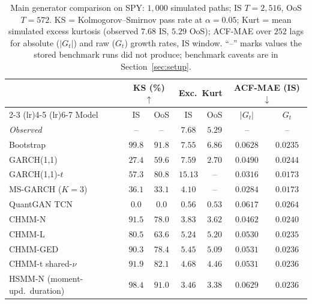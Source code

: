 \begin{table}[t]
\centering
\caption{Main generator comparison on SPY: $1{,}000$ simulated paths; IS $T = 2{,}516$, OoS $T = 572$. KS = Kolmogorov--Smirnov pass rate at $\alpha = 0.05$; Kurt = mean simulated excess kurtosis (observed $7.68$ IS, $5.29$ OoS); ACF-MAE over $252$ lags for absolute ($|G_t|$) and raw ($G_t$) growth rates, IS window. ``--'' marks values the stored benchmark runs did not produce; benchmark caveats are in Section~\ref{sec:setup}.}
\label{tab:model_comparison}
\footnotesize
\setlength{\tabcolsep}{3.4pt}
\renewcommand{\arraystretch}{0.97}
\begin{tabular}{l cc cc cc}
\toprule
& \multicolumn{2}{c}{KS (\%) $\uparrow$} & \multicolumn{2}{c}{Exc.\ Kurt} & \multicolumn{2}{c}{ACF-MAE (IS) $\downarrow$} \\
\cmidrule(lr){2-3} \cmidrule(lr){4-5} \cmidrule(lr){6-7}
Model & IS & OoS & IS & OoS & $|G_t|$ & $G_t$ \\
\midrule
\textit{Observed}     & --     & --     & $7.68$  & $5.29$  & --       & --       \\
Bootstrap             & $99.8$ & $91.8$ & $7.55$  & $6.86$  & $0.0628$ & $0.0235$ \\
GARCH(1,1)            & $27.4$ & $59.6$ & $7.59$  & $2.70$  & $0.0490$ & $0.0244$ \\
GARCH(1,1)-$t$        & $57.3$ & $80.8$ & $15.13$ & --      & $0.0316$ & $0.0173$ \\
MS-GARCH ($K=3$)      & $36.1$ & $33.1$ & $4.10$  & --      & $0.0284$ & $0.0173$ \\
QuantGAN TCN          & $0.0$  & $0.0$  & $0.56$  & $0.53$  & $0.0617$ & $0.0264$ \\
\midrule
CHMM-N                & $91.5$ & $78.0$ & $3.83$  & $3.62$  & $0.0462$ & $0.0240$ \\
CHMM-L                & $80.5$ & $63.6$ & $5.24$  & $5.20$  & $0.0530$ & $0.0235$ \\
CHMM-GED              & $90.3$ & $78.4$ & $5.45$  & $5.09$  & $0.0531$ & $0.0236$ \\
CHMM-t shared-$\nu$   & $91.9$ & $82.1$ & $4.68$  & $4.46$  & $0.0531$ & $0.0236$ \\
\midrule
HSMM-N (moment-upd.\ duration) & $98.4$ & $91.0$ & $3.46$  & $3.38$  & $0.0629$ & $0.0236$ \\
\bottomrule
\end{tabular}
\end{table}

